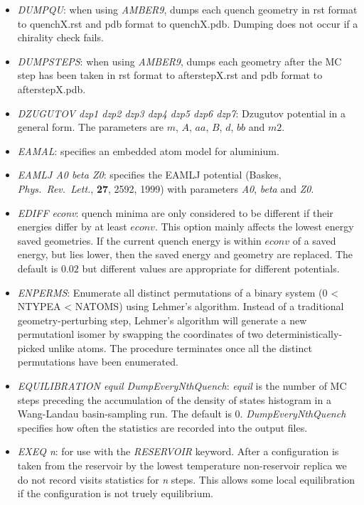 \documentclass[12pt,a4paper,dvips]{article}
\begin{document}
\begin{itemize}
\item {\it DUMPQU\/}: when using {\it AMBER9\/}, dumps each quench geometry in rst format to quenchX.rst 
and pdb format to quenchX.pdb. Dumping does not occur if a chirality check fails.

\item {\it DUMPSTEPS\/}: when using {\it AMBER9\/}, dumps each geometry after the MC step has been taken in rst format to afterstepX.rst 
and pdb format to afterstepX.pdb. 

\item {\it DZUGUTOV dzp1 dzp2 dzp3 dzp4 dzp5 dzp6 dzp7\/}: Dzugutov potential in a general form.
The parameters are $m$, $A$, $aa$, $B$, $d$, $bb$ and $m2$.

\item {\it EAMAL}: specifies an embedded atom model for aluminium.

\item {\it EAMLJ A0 beta Z0\/}: specifies the EAMLJ potential (Baskes, {\it Phys.~Rev.~Lett.\/},
{\bf 27}, 2592, 1999) with parameters {\it A0\/}, {\it beta\/} and {\it Z0\/}.

\item {\it EDIFF econv\/}: quench minima are only considered to be different if their
energies differ by at least $econv$. This option mainly affects the lowest energy
saved geometries. If the current quench energy is within $econv$ of a saved energy, but
lies lower, then the saved energy and geometry are replaced.
The default is $0.02$ but different values are appropriate for different potentials.

\item {\it ENPERMS\/}: Enumerate all distinct permutations of a binary system (0 < NTYPEA < NATOMS) using Lehmer's algorithm. Instead of a traditional geometry-perturbing step, Lehmer's algorithm will generate a new permutationl isomer by swapping the coordinates of two deterministically-picked unlike atoms. The procedure terminates once all the distinct permutations have been enumerated. 
 
\item {\it EQUILIBRATION equil DumpEveryNthQuench\/}: {\it equil} is the number of 
MC steps preceding the accumulation of the
density of states histogram in a Wang-Landau
basin-sampling run. The default is 0. {\it DumpEveryNthQuench} specifies how often the
statistics are recorded into the output files.

\item {\it EXEQ n}: for use with the {\it RESERVOIR\/} keyword. After a configuration is
taken from the reservoir by the lowest temperature non-reservoir replica we do not
record visits statistics for {\it n} steps. This allows some local equilibration if
the configuration is not truely equilibrium.


\end{itemize}
\end{document}
